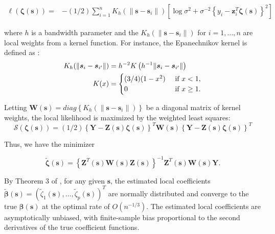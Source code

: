 \documentclass[12pt,english,authoryear, review]{article}\usepackage[]{graphicx}\usepackage[]{color}
\theoremstyle{plain}
\theoremstyle{plain}
\begin{document}
\begin{align}
\ell\left(\bm{\zeta}(\bm{s})\right)= & -(1/2)\sum_{i=1}^{n}K_{h}(\|\bm{s}-\bm{s}_{i}\|)\left[\log\sigma^{2}+\sigma^{-2}\left\{ y_{i}-\bm{z}_{i}^{T}\bm{\zeta}\left(\bm{s}\right)\right\} ^{2}\right]\label{eq:local-log-likelihood}
\end{align}


where $h$ is a bandwidth parameter and the $K_{h}\left(\|\bm{s}-\bm{s}_{i}\|\right)$
for $i=1,\dots,n$ are local weights from a kernel function. For instance,
the Epanechnikov kernel is defined as \citep{Samiuddin-el-Sayyad-1990}:
\begin{align}
K_{h}(\|\bm{s}_{i}-\bm{s}_{i'}\|) & =h^{-2}K\left(h^{-1}\|\bm{s}_{i}-\bm{s}_{i'}\|\right)\notag\label{eq:epanechnikov}\\
K(x) & =\begin{cases}
(3/4)(1-x^{2}) & \mbox{ if }x<1,\\
0 & \mbox{ if }x\geq1.
\end{cases}
\end{align}


Letting $\bm{W}(\bm{s})=diag\left\{ K_{h}(\|\bm{s}-\bm{s}_{i}\|)\right\} $
be a diagonal matrix of kernel weights, the local likelihood is maximized
by the weighted least squares: 
\begin{equation}
\mathcal{S}\left(\bm{\zeta}\left(\bm{s}\right)\right)=(1/2)\left\{ \bm{Y}-\bm{Z}(\bm{s})\bm{\zeta}(\bm{s})\right\} ^{T}\bm{W}(\bm{s})\left\{ \bm{Y}-\bm{Z}(\bm{s})\bm{\zeta}(\bm{s})\right\} ^{T}\label{eq:local-sum-of-squares}
\end{equation}


Thus, we have the minimizer

\begin{equation}
\tilde{\bm{\zeta}}(\bm{s})=\left\{ \bm{Z}^{T}(\bm{s})\bm{W}(\bm{s})\bm{Z}(\bm{s})\right\} ^{-1}\bm{Z}^{T}(\bm{s})\bm{W}(\bm{s})\bm{Y}.\label{eq:zeta-hat}
\end{equation}


By Theorem 3 of \citet{Sun-Yan-Zhang-Lu-2014}, for any given $\bm{s}$,
the estimated local coefficients $\tilde{\bm{\beta}}\left(\bm{s}\right)=\left(\tilde{\zeta}_{1}\left(\bm{s}\right),\dots,\tilde{\zeta}_{p}\left(\bm{s}\right)\right)^{T}$
are normally distributed and converge to the true $\bm{\beta}\left(\bm{s}\right)$
at the optimal rate of $O\left(n^{-1/3}\right)$. The estimated local
coefficients are asymptotically unbiased, with finite-sample bias
proportional to the second derivatives of the true coefficient functions.
\end{document}
